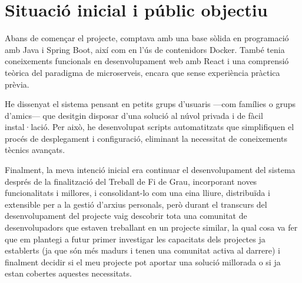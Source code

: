 \section{Situaci\'o inicial i p\'ublic objectiu}

Abans de comen\c{c}ar el projecte, comptava amb una base s\`olida en programaci\'o amb Java i Spring Boot, aix\'i com en l'\'us de contenidors Docker. Tamb\'e tenia coneixements funcionals en desenvolupament web amb React i una comprensi\'o te\`orica del paradigma de microserveis, encara que sense experi\`encia pr\`actica pr\`evia.

He dissenyat el sistema pensant en petits grups d'usuaris —com fam\'ilies o grups d'amics— que desitgin disposar d'una soluci\'o al n\'uvol privada i de f\`acil instal·laci\'o. Per aix\`o, he desenvolupat scripts automatitzats que simplifiquen el proc\'es de desplegament i configuraci\'o, eliminant la necessitat de coneixements t\`ecnics avan\c{c}ats.

Finalment, la meva intenci\'o inicial era continuar el desenvolupament del sistema despr\'es de la finalitzaci\'o del Treball de Fi de Grau, incorporant noves funcionalitats i millores, i consolidant-lo com una eina lliure, distribu\"ida i extensible per a la gesti\'o d'arxius personals, per\`o durant el transcurs del desenvolupament del projecte vaig descobrir tota una comunitat de desenvolupadors que estaven treballant en un projecte similar, la qual cosa va fer que em plantegi a futur primer investigar les capacitats dels projectes ja establerts (ja que s\'on m\'es madurs i tenen una comunitat activa al darrere) i finalment decidir si el meu projecte pot aportar una soluci\'o millorada o si ja estan cobertes aquestes necessitats.



